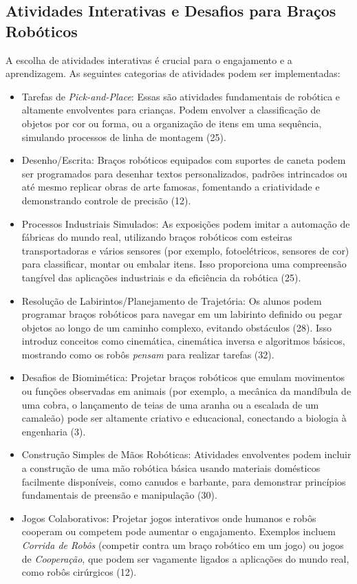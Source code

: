 \documentclass[%
  a4paper,%
  12pt,%
  fleqn,%
  english,%
  brazilian,%
]{article}
\begin{document}
\subsection{Atividades Interativas e Desafios para Braços Robóticos}
A escolha de atividades interativas é crucial para o engajamento e a aprendizagem. As seguintes categorias de atividades podem ser implementadas:
	\begin{itemize}
		\item Tarefas de \emph{Pick-and-Place}: Essas são atividades fundamentais de robótica e altamente envolventes para crianças. Podem envolver a classificação de objetos por cor ou forma, ou a organização de itens em uma sequência, simulando processos de linha de montagem (25).
		\item Desenho/Escrita: Braços robóticos equipados com suportes de caneta podem ser programados para desenhar textos personalizados, padrões intrincados ou até mesmo replicar obras de arte famosas, fomentando a criatividade e demonstrando controle de precisão (12).
		\item Processos Industriais Simulados: As exposições podem imitar a automação de fábricas do mundo real, utilizando braços robóticos com esteiras transportadoras e vários sensores (por exemplo, fotoelétricos, sensores de cor) para classificar, montar ou embalar itens. Isso proporciona uma compreensão tangível das aplicações industriais e da eficiência da robótica (25).
		\item Resolução de Labirintos/Planejamento de Trajetória: Os alunos podem programar braços robóticos para navegar em um labirinto definido ou pegar objetos ao longo de um caminho complexo, evitando obstáculos (28). Isso introduz conceitos como cinemática, cinemática inversa e algoritmos básicos, mostrando como os robôs \emph{pensam} para realizar tarefas (32).
		\item Desafios de Biomimética: Projetar braços robóticos que emulam movimentos ou funções observadas em animais (por exemplo, a mecânica da mandíbula de uma cobra, o lançamento de teias de uma aranha ou a escalada de um camaleão) pode ser altamente criativo e educacional, conectando a biologia à engenharia (3). 
		\item Construção Simples de Mãos Robóticas: Atividades envolventes podem incluir a construção de uma mão robótica básica usando materiais domésticos facilmente disponíveis, como canudos e barbante, para demonstrar princípios fundamentais de preensão e manipulação (30).
		\item Jogos Colaborativos: Projetar jogos interativos onde humanos e robôs cooperam ou competem pode aumentar o engajamento. Exemplos incluem \emph{Corrida de Robôs} (competir contra um braço robótico em um jogo) ou jogos de \emph{Cooperação}, que podem ser vagamente ligados a aplicações do mundo real, como robôs cirúrgicos (12).
	\end{itemize}
\end{document}
